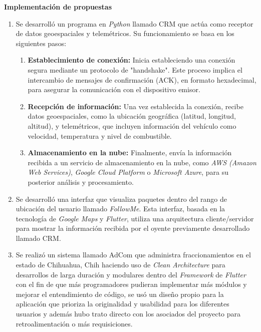 \documentclass[protocolo.tex]{subfiles}
\begin{document}
\textbf{Implementación de propuestas}
\begin{enumerate}
\item Se desarrolló un programa en \textit{Python} llamado CRM que actúa como receptor de datos geoespaciales y telemétricos. Su funcionamiento se basa en los siguientes pasos:
\begin{enumerate}
    \item \textbf{Establecimiento de conexión:}  Inicia estableciendo una conexión segura mediante un protocolo de "handshake". Este proceso implica el intercambio de mensajes de confirmación (ACK), en formato hexadecimal, para asegurar la comunicación con el dispositivo emisor.
    \item \textbf{Recepción de información:} Una vez establecida la conexión,  recibe datos geoespaciales, como la ubicación geográfica (latitud, longitud, altitud), y telemétricos, que incluyen información del vehículo como velocidad, temperatura y nivel de combustible.
    \item \textbf{Almacenamiento en la nube:} Finalmente, envía la información recibida a un servicio de almacenamiento en la nube, como  \textit{AWS (Amazon Web Services)}, \textit{Google Cloud Platform} o \textit{Microsoft Azure}, para su posterior análisis y procesamiento.
\end{enumerate}


\item Se desarrolló una interfaz que visualiza paquetes dentro del rango de ubicación del usuario llamado \textit{FollowMe}. Esta interfaz, basada en la tecnología de \textit{Google Maps} y \textit{Flutter}, utiliza una arquitectura cliente/servidor para mostrar la información recibida por el oyente previamente desarrollado llamado CRM.

\item Se realizó un sistema llamado AdCom que administra fraccionamientos en el estado de Chihuahua,
Chih haciendo uso de \textit{Clean Architecture} para desarrollos de larga duración y modulares
dentro del \textit{Framework} de \textit{Flutter} con el fin de que más programadores pudieran
implementar más módulos y mejorar el entendimiento de código, se usó un diseño propio
para la aplicación que prioriza la originalidad y usabilidad para los diferentes usuarios y además hubo
trato directo con los asociados del proyecto para retroalimentación o más requisiciones.
\end{enumerate}
\end{document}

